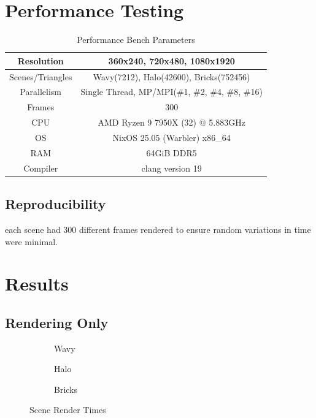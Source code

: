 \documentclass[12pt]{article}
\begin{document}
\section{Performance Testing}

\begin{table}[H]
	\caption{Performance Bench Parameters}
	\centering
	\begin{tabular}{|c|c|}
		\hline
		Resolution& 360x240, 720x480, 1080x1920\\\hline
		Scenes/Triangles& Wavy(7212), Halo(42600), Bricks(752456)\\\hline
		Parallelism& Single Thread, MP/MPI(\#1, \#2, \#4, \#8, \#16)\\\hline
		Frames&300\\\hline
		CPU&AMD Ryzen 9 7950X (32) @ 5.883GHz\\\hline
		OS&NixOS 25.05 (Warbler) x86\_64\\\hline
		RAM&64GiB DDR5 \\\hline
		Compiler&clang version 19\\\hline
	\end{tabular}
	\label{table:performance-720-brick}
\end{table}

\subsection{Reproducibility} 
each scene had 300 different frames rendered to ensure random variations in time were minimal.

\section{Results}

\subsection{Rendering Only}

\begin{figure}[H]
	\centering
	\begin{subfigure}{.475\linewidth}
		\centering
		
		\caption{Wavy}
		\label{plot:wavy_render}
	\end{subfigure}\hfill
	\begin{subfigure}{.475\linewidth}
		\centering
		
		\caption{Halo}
		\label{plot:halo_render}
	\end{subfigure}
	\medskip
	\begin{subfigure}{.475\linewidth}
		\centering
		
		\caption{Bricks}
		\label{plot:bricks_render}
	\end{subfigure}
	\caption{Scene Render Times}
	\label{plot:render}
\end{figure}
\end{document}
